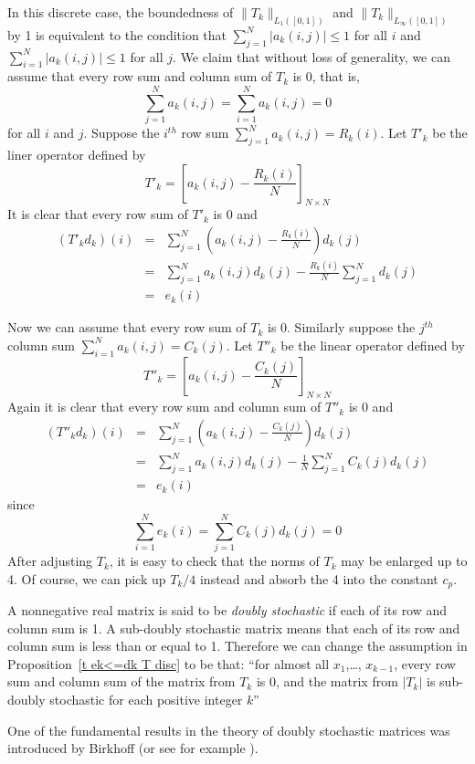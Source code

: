 \documentclass[12pt]{amsart}
\begin{document}
In this discrete case, the boundedness of $\|T_k\|_{L_1([0,1])}$
and $\|T_k\|_{L_\infty ([0,1]) }$ by 1 is equivalent to the
condition that $\sum_{j=1}^N |a_k(i,j)|\leq 1 $ for all $i$ and
$\sum_{i=1}^N |a_k(i,j)|\leq 1$ for all $j$. We claim that without
loss of generality, we can assume that every row sum and column
sum of $T_k$ is 0, that is,
\[ \sum_{j=1}^N a_k(i,j)= \sum_{i=1}^N a_k(i,j)=0\]
for all $i$ and $j$.
Suppose the $i^{th}$ row sum $\sum_{j=1}^N
a_k(i,j)=R_k(i)$. Let $T'_k$ be the liner operator defined by
\[T'_k=\left[a_k(i,j)-\frac{R_k(i)}{N} \right]_{N\times N}\]
It is clear that every row sum of $T'_k$ is 0 and
\begin{eqnarray*}
(T'_kd_k)(i)&=& \sum_{j=1}^N \left(a_k(i,j)-\frac{R_k(i)}{N} \right)d_k(j)\\
            &=& \sum_{j=1}^N a_k(i,j)d_k(j)-\frac{R_k(i)}{N} \sum_{j=1}^N d_k(j)\\
            &=& e_k(i)
\end{eqnarray*}

Now we can assume that every row sum of $T_k$ is 0. Similarly
suppose the $j^{th}$ column sum $\sum_{i=1}^N a_k(i,j)=C_k(j)$.
Let $T''_k$ be the linear operator defined by
\[T''_k=\left[a_k(i,j)-\frac{C_k(j)}{N} \right]_{N\times N}\]
Again it is clear that every row sum and column sum of $T''_k$ is
0 and
\begin{eqnarray*}
(T''_kd_k)(i)&=& \sum_{j=1}^N \left(a_k(i,j)-\frac{C_k(j)}{N} \right)d_k(j)\\
            &=& \sum_{j=1}^N a_k(i,j)d_k(j)-\frac{1}{N} \sum_{j=1}^N C_k(j)d_k(j)\\
            &=& e_k(i)
\end{eqnarray*}
since
\[\sum_{i=1}^N e_k(i)= \sum_{j=1}^N C_k(j)d_k(j)=0\]
After adjusting $T_k$, it is easy to check that the norms of $T_k$
may be enlarged up to 4. Of course, we can pick up $T_k /4 $
instead and absorb the 4 into the constant $c_p$.

A nonnegative real matrix is said to be \emph{doubly stochastic}
if each of its row and column sum is 1. A sub-doubly stochastic
matrix means that each of its row and column sum is less than or
equal to 1. Therefore we can change the assumption in
Proposition~\ref{t ek<=dk T disc} to be that: ``for almost all
$x_1$,\dots, $x_{k-1}$, every row sum and column sum of the matrix
from $T_k$ is 0, and the matrix from $|T_k|$ is sub-doubly
stochastic for each positive integer $k$''

One of the fundamental results in the theory of doubly stochastic
matrices was introduced by Birkhoff \cite{BI1} (or see for example
\cite{M1}).
\end{document}
